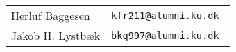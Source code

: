 \clearpage
\maketitle
\vspace{10cm}
\begin{tabular}{l l}
    Herluf Baggesen & \tt{kfr211@alumni.ku.dk} \\
    Jakob H. Lystbæk & \tt{bkq997@alumni.ku.dk}
\end{tabular}
\thispagestyle{empty} %
\begin{bottom}

\end{bottom}
\pagebreak
\setcounter{page}{1}
